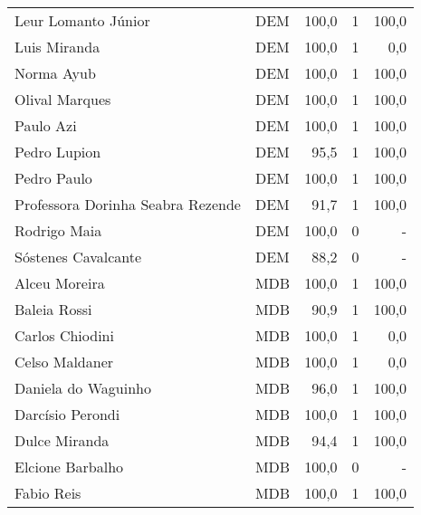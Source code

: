 \begin{longtable}{llrrr}
                 Leur Lomanto Júnior &            DEM &     100,0 &            1 &      100,0 \\
                        Luis Miranda &            DEM &     100,0 &            1 &        0,0 \\
                          Norma Ayub &            DEM &     100,0 &            1 &      100,0 \\
                      Olival Marques &            DEM &     100,0 &            1 &      100,0 \\
                           Paulo Azi &            DEM &     100,0 &            1 &      100,0 \\
                        Pedro Lupion &            DEM &      95,5 &            1 &      100,0 \\
                         Pedro Paulo &            DEM &     100,0 &            1 &      100,0 \\
   Professora Dorinha Seabra Rezende &            DEM &      91,7 &            1 &      100,0 \\
                        Rodrigo Maia &            DEM &     100,0 &            0 &          - \\
                 Sóstenes Cavalcante &            DEM &      88,2 &            0 &          - \\
                       Alceu Moreira &            MDB &     100,0 &            1 &      100,0 \\
                        Baleia Rossi &            MDB &      90,9 &            1 &      100,0 \\
                     Carlos Chiodini &            MDB &     100,0 &            1 &        0,0 \\
                      Celso Maldaner &            MDB &     100,0 &            1 &        0,0 \\
                 Daniela do Waguinho &            MDB &      96,0 &            1 &      100,0 \\
                    Darcísio Perondi &            MDB &     100,0 &            1 &      100,0 \\
                       Dulce Miranda &            MDB &      94,4 &            1 &      100,0 \\
                    Elcione Barbalho &            MDB &     100,0 &            0 &          - \\
                          Fabio Reis &            MDB &     100,0 &            1 &      100,0 \\

\end{longtable}
